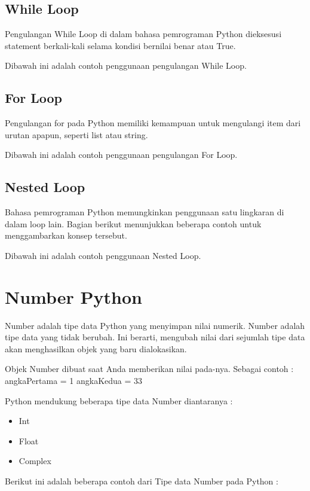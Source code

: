 \subsection{While Loop}
Pengulangan While Loop di dalam bahasa pemrograman Python dieksesusi statement berkali-kali selama kondisi bernilai benar atau True.

Dibawah ini adalah contoh penggunaan pengulangan While Loop.



\subsection{For Loop}
Pengulangan for pada Python memiliki kemampuan untuk mengulangi item dari urutan apapun, seperti list atau string.

Dibawah ini adalah contoh penggunaan pengulangan For Loop.



\subsection{Nested Loop}
Bahasa pemrograman Python memungkinkan penggunaan satu lingkaran di dalam loop lain. Bagian berikut menunjukkan beberapa contoh untuk menggambarkan konsep tersebut.

Dibawah ini adalah contoh penggunaan Nested Loop.



\section{Number Python}
Number adalah tipe data Python yang menyimpan nilai numerik. Number adalah tipe data yang tidak berubah. Ini berarti, mengubah nilai dari sejumlah tipe data akan menghasilkan objek yang baru dialokasikan.

Objek Number dibuat saat Anda memberikan nilai pada-nya. Sebagai contoh : angkaPertama = 1 angkaKedua = 33

Python mendukung beberapa tipe data Number diantaranya :
\begin{itemize}
\item Int
\item Float
\item Complex
\end{itemize}

Berikut ini adalah beberapa contoh dari Tipe data Number pada Python :

